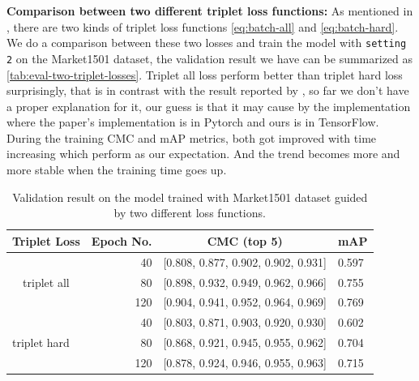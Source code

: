 \textbf{Comparison between two different triplet loss functions:}
As mentioned in \cite{in-defense-of-triplet-loss-for-reid-2017}, there are two
kinds of triplet loss functions \autoref{eq:batch-all} and
\autoref{eq:batch-hard}.
We do a comparison between these two losses and train the model with
\texttt{setting 2} on the Market1501 dataset, the validation result we have can
be summarized as \autoref{tab:eval-two-triplet-losses}. Triplet all loss
perform better than triplet hard loss surprisingly, that is in contrast with
the result reported by \cite{in-defense-of-triplet-loss-for-reid-2017}, so far
we don't have a proper explanation for it, our guess is that it may cause by
the implementation where the paper's implementation is in Pytorch and ours is
in TensorFlow.
During the training CMC and mAP metrics, both got improved with time increasing
which perform as our expectation. And the trend becomes more and more stable
when the training time goes up.

\begin{table}[]
    \centering
    \begin{tabular}{|l|r|l|l|}
        \hline
        \textbf{Triplet Loss}                     &
        \multicolumn{1}{c|}{\textbf{Epoch No.}}   &
        \multicolumn{1}{c|}{\textbf{CMC (top 5)}} &
        \multicolumn{1}{c|}{\textbf{mAP}} \\ \hline
        \multicolumn{1}{|c|}{\multirow{3}{*}{triplet all}}
        & 40  & {[}0.808, 0.877, 0.902, 0.902, 0.931{]} & 0.597
        \\ \cline{2-4}
        \multicolumn{1}{|c|}{}
        & 80  & {[}0.898, 0.932, 0.949, 0.962, 0.966{]}  & 0.755
        \\ \cline{2-4}
        \multicolumn{1}{|c|}{}
        & 120 & {[}0.904, 0.941, 0.952, 0.964, 0.969{]} & 0.769
        \\ \hline
        \multirow{3}{*}{triplet hard}
        & 40  & {[}0.803, 0.871, 0.903, 0.920, 0.930{]} & 0.602
        \\ \cline{2-4}
        & 80  & {[}0.868, 0.921, 0.945, 0.955, 0.962{]} & 0.704
        \\ \cline{2-4}
        & 120 & {[}0.878, 0.924, 0.946, 0.955, 0.963{]} & 0.715
        \\ \hline
    \end{tabular}
    \caption[Validation result on the model trained with Market1501 dataset]
    {Validation result on the model trained with Market1501 dataset guided by
        two different loss functions.}
    \label{tab:eval-two-triplet-losses}
\end{table}

